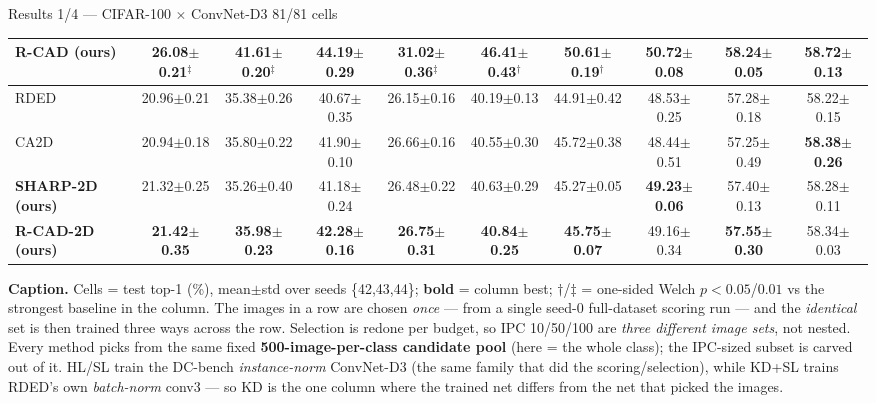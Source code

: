 \documentclass[aspectratio=169]{beamer}
\begin{document}
\begin{frame}{Results 1/4 --- CIFAR-100 $\times$ ConvNet-D3 \hfill {\small 81/81 cells}}
\begin{center}
{\begin{tabular}{l ccc ccc ccc}
    \textbf{R-CAD (ours)} & \textbf{26.08{\scriptsize$\pm$0.21}$^{\ddagger}$} & \textbf{41.61{\scriptsize$\pm$0.20}$^{\ddagger}$} & 44.19{\scriptsize$\pm$0.29} & \textbf{31.02{\scriptsize$\pm$0.36}$^{\ddagger}$} & \textbf{46.41{\scriptsize$\pm$0.43}$^{\dagger}$} & 50.61{\scriptsize$\pm$0.19}$^{\dagger}$ & 50.72{\scriptsize$\pm$0.08} & 58.24{\scriptsize$\pm$0.05} & 58.72{\scriptsize$\pm$0.13} \\
    \midrule
    RDED & 20.96{\scriptsize$\pm$0.21} & 35.38{\scriptsize$\pm$0.26} & 40.67{\scriptsize$\pm$0.35} & 26.15{\scriptsize$\pm$0.16} & 40.19{\scriptsize$\pm$0.13} & 44.91{\scriptsize$\pm$0.42} & 48.53{\scriptsize$\pm$0.25} & 57.28{\scriptsize$\pm$0.18} & 58.22{\scriptsize$\pm$0.15} \\
    CA2D & 20.94{\scriptsize$\pm$0.18} & 35.80{\scriptsize$\pm$0.22} & 41.90{\scriptsize$\pm$0.10} & 26.66{\scriptsize$\pm$0.16} & 40.55{\scriptsize$\pm$0.30} & 45.72{\scriptsize$\pm$0.38} & 48.44{\scriptsize$\pm$0.51} & 57.25{\scriptsize$\pm$0.49} & \textbf{58.38{\scriptsize$\pm$0.26}} \\
    \textbf{SHARP-2D (ours)} & 21.32{\scriptsize$\pm$0.25} & 35.26{\scriptsize$\pm$0.40} & 41.18{\scriptsize$\pm$0.24} & 26.48{\scriptsize$\pm$0.22} & 40.63{\scriptsize$\pm$0.29} & 45.27{\scriptsize$\pm$0.05} & \textbf{49.23{\scriptsize$\pm$0.06}} & 57.40{\scriptsize$\pm$0.13} & 58.28{\scriptsize$\pm$0.11} \\
    \textbf{R-CAD-2D (ours)} & \textbf{21.42{\scriptsize$\pm$0.35}} & \textbf{35.98{\scriptsize$\pm$0.23}} & \textbf{42.28{\scriptsize$\pm$0.16}} & \textbf{26.75{\scriptsize$\pm$0.31}} & \textbf{40.84{\scriptsize$\pm$0.25}} & \textbf{45.75{\scriptsize$\pm$0.07}} & 49.16{\scriptsize$\pm$0.34} & \textbf{57.55{\scriptsize$\pm$0.30}} & 58.34{\scriptsize$\pm$0.03} \\
    \bottomrule
    \end{tabular}}
    \end{center}
    \vspace{-0.05cm}
{\tiny \textbf{Caption.} Cells = test top-1 (\%), mean$\pm$std over seeds
\{42,43,44\}; \textbf{bold} = column best; $\dagger$/$\ddagger$ = one-sided Welch $p{<}0.05$/$0.01$ vs
the strongest baseline in the column. The images in a row are chosen \emph{once} --- from a single seed-0
full-dataset scoring run --- and the \emph{identical} set is then trained three ways across the row. Selection is redone per budget, so IPC 10/50/100 are \emph{three different image sets}, not nested.
Every method picks from the same fixed \textbf{500-image-per-class candidate pool} (here = the whole
class); the IPC-sized subset is carved out of it. HL/SL
train the DC-bench \emph{instance-norm} ConvNet-D3 (the same family that did the scoring/selection),
while KD+SL trains RDED's own \emph{batch-norm} conv3 --- so KD is the one column where the trained net
differs from the net that picked the images.}
\end{frame}
\end{document}
